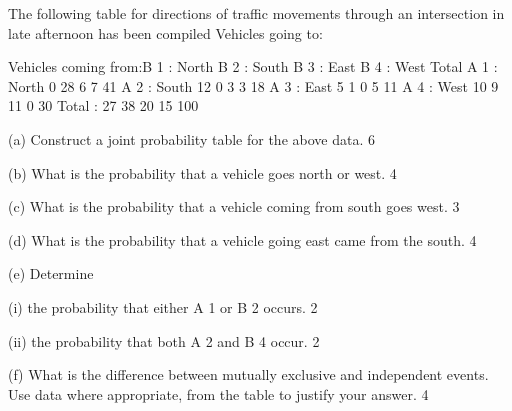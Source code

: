 

The following table for directions of traffic movements through an intersection in late afternoon has been compiled 
Vehicles going to:

Vehicles coming from:B 1 : North B 2 : South    B 3 : East     B 4 : West      Total 
A 1 : North 0 28        6    7   41 
A 2 : South 12 0        3    3   18 
A 3 : East  5 1         0    5           11 
A 4 : West 10 9        11                  0          30         
Total : 27 38        20                    15        100 

(a) Construct a joint probability table for the above data. 6 

(b) What is the probability that a vehicle goes north or west. 4 

(c) What is the probability that a vehicle coming from south goes west. 3 

(d) What is the probability that a vehicle going east came from the south. 4 

(e) Determine 

(i) the probability that either A 1 or B 2 occurs. 2 

(ii) the probability that both A 2 and B 4 occur. 2 

(f)  What is the difference between mutually exclusive and independent events.  Use data  where appropriate, from the table to justify your answer. 4

\newpage
